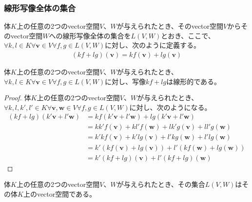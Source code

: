 \documentclass[dvipdfmx]{jsarticle}
\begin{document}
\subsubsection{線形写像全体の集合}%
\begin{dfn}\label{線形写像の線形結合の定義}
体$K$上の任意の2つのvector空間$V$、$W$が与えられたとき、そのvector空間$V$からそのvector空間$W$への線形写像全体の集合を$L(V,W)$とおき、ここで、$\forall k,l \in K\forall\mathbf{v} \in V\forall f,g \in L(V,W)$に対し、次のように定義する。
\begin{align*}
\left( kf + lg \right)\left( \mathbf{v} \right) = kf\left( \mathbf{v} \right) + lg\left( \mathbf{v} \right)
\end{align*}
\end{dfn}
\begin{thm}\label{2.1.2.7}
体$K$上の任意の2つのvector空間$V$、$W$が与えられたとき、$\forall k,l \in K\forall\mathbf{v} \in V\forall f,g \in L(V,W)$に対し、写像$kf + lg$は線形的である。
\end{thm}
\begin{proof}
体$K$上の任意の2つのvector空間$V$、$W$が与えられたとき、$\forall k,l,k',l' \in K\forall\mathbf{v},\mathbf{w} \in V\forall f,g \in L(V,W)$に対し、次のようになる。
\begin{align*}
\left( kf + lg \right)\left( k'\mathbf{v} + l'\mathbf{w} \right) &= kf\left( k'\mathbf{v} + l'\mathbf{w} \right) + lg\left( k'\mathbf{v} + l'\mathbf{w} \right)\\
&= kk'f\left( \mathbf{v} \right) + kl'f\left( \mathbf{w} \right) + lk'g\left( \mathbf{v} \right) + ll'g\left( \mathbf{w} \right)\\
&= k'kf\left( \mathbf{v} \right) + k'lg\left( \mathbf{v} \right) + l'kg\left( \mathbf{w} \right) + l'lg\left( \mathbf{w} \right)\\
&= k'\left( kf\left( \mathbf{v} \right) + lg\left( \mathbf{v} \right) \right) + l'\left( kf\left( \mathbf{w} \right) + lg\left( \mathbf{w} \right) \right)\\
&= k'\left( kf + lg \right)\left( \mathbf{v} \right) + l'\left( kf + lg \right)\left( \mathbf{w} \right)
\end{align*}
\end{proof}
\begin{thm}\label{2.1.2.8}
体$K$上の任意の2つのvector空間$V$、$W$が与えられたとき、その集合$L(V,W)$はその体$K$上のvector空間である。
\end{thm}
\end{document}

